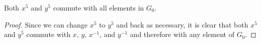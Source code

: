 \begin{lemma} Both $x^{5}$ and $y^{5}$ commute with all elements in $G_0$.
\label{lemma:G_0:center}
\end{lemma}
\begin{proof} Since we can change $x^5$ to $y^5$ and back as necessary, it is clear that both $x^5$ and $y^5$ commute with $x$, $y$, $x^{-1}$, and $y^{-1}$ and therefore with any element of $G_0$.

\end{proof}


